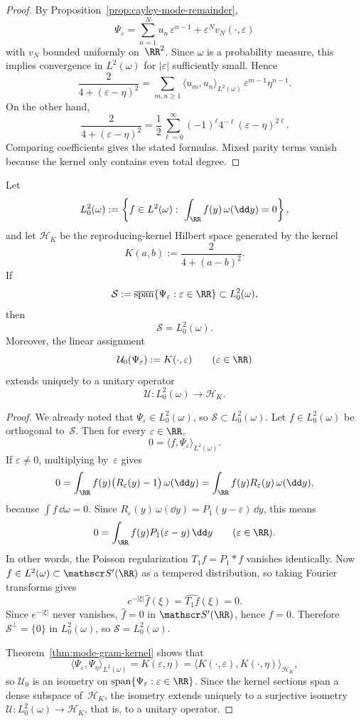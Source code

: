 \begin{proof}
By Proposition~\ref{prop:cayley-mode-remainder},
\[
\Psi_\varepsilon
=\sum_{n=1}^{N}u_n\,\varepsilon^{n-1}
+\varepsilon^N v_N(\cdot,\varepsilon)
\]
with $v_N$ bounded uniformly on~$\RR^2$.  Since $\omega$ is a probability
measure, this implies convergence in $L^2(\omega)$ for $|\varepsilon|$
sufficiently small.  Hence
\[
\frac{2}{4+(\varepsilon-\eta)^2}
=\sum_{m,n\ge 1}
\langle u_m,u_n\rangle_{L^2(\omega)}\,
\varepsilon^{m-1}\eta^{n-1}.
\]
On the other hand,
\[
\frac{2}{4+(\varepsilon-\eta)^2}
=\frac12\sum_{\ell=0}^{\infty}
(-1)^\ell 4^{-\ell}(\varepsilon-\eta)^{2\ell}.
\]
Comparing coefficients gives the stated formulas.  Mixed parity terms
vanish because the kernel only contains even total degree.
\end{proof}

\begin{theorem}%
\label{thm:mode-space-rkhs}
Let
\[
L^2_0(\omega):=
\left\{
f\in L^2(\omega):\ \int_{\RR}f(y)\,\omega(\dd y)=0
\right\},
\]
and let $\mathcal H_K$ be the reproducing-kernel Hilbert space generated
by the kernel
\[
K(a,b):=\frac{2}{4+(a-b)^2}.
\]
If
\[
\mathcal S:=\overline{\operatorname{span}}\{\Psi_\varepsilon:\varepsilon\in\RR\}
\subset L^2_0(\omega),
\]
then
\[
\mathcal S=L^2_0(\omega).
\]
Moreover, the linear assignment
\[
\mathcal U_0(\Psi_\varepsilon):=K(\cdot,\varepsilon)
\qquad(\varepsilon\in\RR)
\]
extends uniquely to a unitary operator
\[
\mathcal U:L^2_0(\omega)\longrightarrow \mathcal H_K.
\]
\end{theorem}

\begin{proof}
We already noted that $\Psi_\varepsilon\in L^2_0(\omega)$, so
$\mathcal S\subset L^2_0(\omega)$.  Let
$f\in L^2_0(\omega)$ be orthogonal to~$\mathcal S$.  Then for every
$\varepsilon\in\RR$,
\[
0=\langle f,\Psi_\varepsilon\rangle_{L^2(\omega)}.
\]
If $\varepsilon\neq 0$, multiplying by~$\varepsilon$ gives
\[
0=\int_{\RR}f(y)\bigl(R_\varepsilon(y)-1\bigr)\,\omega(\dd y)
=\int_{\RR}f(y)R_\varepsilon(y)\,\omega(\dd y),
\]
because $\int f\,\dd\omega=0$.  Since
$R_\varepsilon(y)\,\omega(\dd y)=P_1(y-\varepsilon)\,\dd y$, this means
\[
0=\int_{\RR}f(y)P_1(\varepsilon-y)\,\dd y
\qquad(\varepsilon\in\RR).
\]
In other words, the Poisson regularization $T_1f=P_1*f$ vanishes
identically.  Now $f\in L^2(\omega)\subset\mathscr S'(\RR)$ as a tempered
distribution, so taking Fourier transforms gives
\[
e^{-|\xi|}\widehat f(\xi)=\widehat{T_1f}(\xi)=0.
\]
Since $e^{-|\xi|}$ never vanishes, $\widehat f=0$ in $\mathscr S'(\RR)$,
hence $f=0$.  Therefore $\mathcal S^\perp=\{0\}$ in $L^2_0(\omega)$, so
$\mathcal S=L^2_0(\omega)$.

Theorem~\ref{thm:mode-gram-kernel} shows that
\[
\langle \Psi_\varepsilon,\Psi_\eta\rangle_{L^2(\omega)}
=K(\varepsilon,\eta)
=\langle K(\cdot,\varepsilon),K(\cdot,\eta)\rangle_{\mathcal H_K},
\]
so $\mathcal U_0$ is an isometry on
$\operatorname{span}\{\Psi_\varepsilon:\varepsilon\in\RR\}$.  Since the
kernel sections span a dense subspace of~$\mathcal H_K$, the isometry
extends uniquely to a surjective isometry
$\mathcal U:L^2_0(\omega)\to\mathcal H_K$, that is, to a unitary
operator.
\end{proof}

